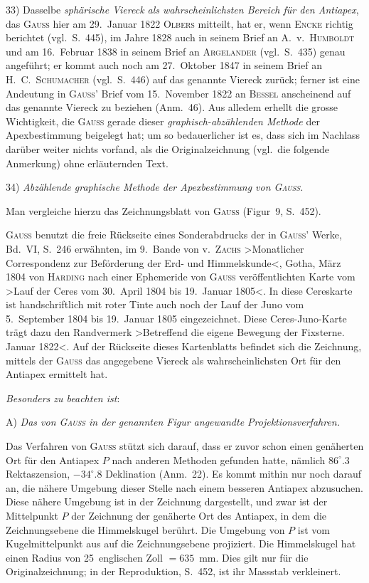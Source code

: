 \documentclass[12pt,a4paper]{article}
\theoremstyle{plain}
\theoremstyle{definition}
\theoremstyle{remark}
\begin{document}
\begin{small}
33) Dasselbe \textit{sph\"arische Viereck als wahrscheinlichsten Bereich f\"ur den
Antiapex}, das \textsc{Gauss} hier am 29.~Januar 1822 \textsc{Olbers} mitteilt, hat er, wenn
\textsc{Encke} richtig berichtet (vgl.~S.~445), im Jahre 1828 auch in seinem Brief
an A.~v.~\textsc{Humboldt} und am 16.~Februar 1838 in seinem Brief an \textsc{Argelander}
(vgl.~S.~435) genau angef\"uhrt; er kommt auch noch am 27.~Oktober 1847 in seinem
Brief an H.~C.~\textsc{Schumacher} (vgl.~S.~446) auf das genannte Viereck zur\"uck;
ferner ist eine Andeutung in \textsc{Gauss'} Brief vom 15.~November 1822 an \textsc{Bessel}
anscheinend auf das genannte Viereck zu beziehen (Anm.~46). Aus alledem erhellt
die grosse Wichtigkeit, die \textsc{Gauss} gerade dieser \textit{graphisch-abz\"ahlenden Methode}
der Apexbestimmung beigelegt hat; um so bedauerlicher ist es, dass sich im
Nachlass dar\"uber weiter nichts vorfand, als die Originalzeichnung (vgl.~die
folgende Anmerkung) ohne erl\"auternden Text.

34) \textit{Abz\"ahlende graphische Methode der Apexbestimmung von \textsc{Gauss}.}

Man vergleiche hierzu das Zeichnungsblatt von \textsc{Gauss} (Figur~9, S.~452).

\textsc{Gauss} benutzt die freie R\"uckseite eines Sonderabdrucks der in \textsc{Gauss'} Werke,
Bd.~VI, S.~246 erw\"ahnten, im 9.~Bande von v.~\textsc{Zachs} \textgreater{}Monatlicher Correspondenz
zur Bef\"orderung der Erd- und Himmelskunde\textless{}, Gotha, M\"arz 1804 von \textsc{Harding}
nach einer Ephemeride von \textsc{Gauss} ver\"offentlichten Karte vom \textgreater{}Lauf der Ceres
vom 30.~April 1804 bis 19.~Januar 1805\textless{}. In diese Cereskarte ist handschriftlich
mit roter Tinte auch noch der Lauf der Juno vom 5.~September 1804 bis
19.~Januar 1805 eingezeichnet. Diese Ceres-Juno-Karte tr\"agt dazu den Randvermerk
\textgreater{}Betreffend die eigene Bewegung der Fixsterne. Januar 1822\textless{}. Auf der
R\"uckseite dieses Kartenblatts befindet sich die Zeichnung, mittels der \textsc{Gauss}
das angegebene Viereck als wahrscheinlichsten Ort f\"ur den Antiapex ermittelt hat.

\textit{Besonders zu beachten ist}:

A) \textit{Das von \textsc{Gauss} in der genannten Figur angewandte Projektionsverfahren.}

Das Verfahren von \textsc{Gauss} st\"utzt sich darauf, dass er zuvor schon einen
gen\"aherten Ort f\"ur den Antiapex $P$ nach anderen Methoden gefunden hatte,
n\"amlich $86^{\circ}\!.3$ Rektaszension, $-34^{\circ}\!.8$ Deklination (Anm.~22). Es
kommt mithin nur noch darauf an, die n\"ahere Umgebung dieser Stelle nach einem
besseren Antiapex abzusuchen. Diese n\"ahere Umgebung ist in der Zeichnung
dargestellt, und zwar ist der Mittelpunkt $P$ der Zeichnung der gen\"aherte Ort
des Antiapex, in dem die Zeichnungsebene die Himmelskugel ber\"uhrt. Die Umgebung
von $P$ ist vom Kugelmittelpunkt aus auf die Zeichnungsebene projiziert. Die
Himmelskugel hat einen Radius von 25~englischen Zoll $= 635$~mm. Dies gilt nur
f\"ur die Originalzeichnung; in der Reproduktion, S.~452, ist ihr Massstab
verkleinert.


\end{small}
\end{document}
